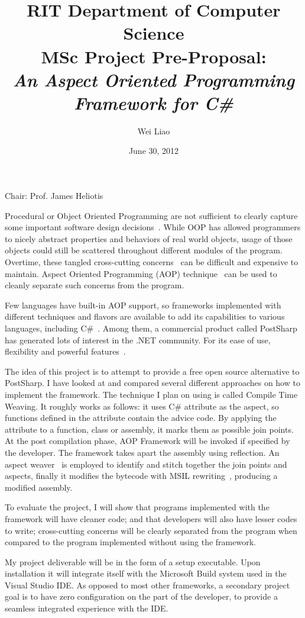 \documentclass[11pt]{artikel3}
\title{RIT Department of Computer Science\\MSc Project Pre-Proposal:\\\emph{An Aspect Oriented Programming Framework for C\#}}
\author{Wei Liao}
\date{June 30, 2012}
\begin{document}
\maketitle
Chair: Prof. James Heliotis

Procedural or Object Oriented Programming are not sufficient to clearly capture some important software design decisions~\cite{aop}. While OOP has allowed programmers to nicely abstract properties and behaviors of real world objects, usage of those objects could still be scattered throughout different modules of the program. Overtime, these tangled cross-cutting concerns~\cite{aop} can be difficult and expensive to maintain. Aspect Oriented Programming (AOP) technique~\cite{aop} can be used to cleanly separate such concerns from the program.

Few languages have built-in AOP support, so frameworks implemented with different techniques and flavors are available to add its capabilities to various languages, including C\#~\cite{postsharp, aspectcs, aopcs}. Among them, a commercial product called PostSharp has generated lots of interest in the .NET community. For its ease of use, flexibility and powerful features~\cite{postsharp}.

The idea of this project is to attempt to provide a free open source alternative to PostSharp. I have looked at and compared several different approaches on how to implement the framework. The technique I plan on using is called Compile Time Weaving. It roughly works as follows: it uses C\# attribute as the aspect, so functions defined in the attribute contain the advice code. By applying the attribute to a function, class or assembly, it marks them as possible join points. At the post compilation phase, AOP Framework will be invoked if specified by the developer. The framework takes apart the assembly using reflection. An aspect weaver~\cite{aop, postsharp} is employed to identify and stitch together the join points and aspects, finally it modifies the bytecode with MSIL rewriting~\cite{rewrite_msil}, producing a modified assembly.

To evaluate the project, I will show that programs implemented with the framework will have cleaner code; and that developers will also have lesser codes to write; cross-cutting concerns will be clearly separated from the program when compared to the program implemented without using the framework.

My project deliverable will be in the form of a setup executable. Upon installation it will integrate itself with the Microsoft Build system used in the Visual Studio IDE. As opposed to most other frameworks, a secondary project goal is to have zero configuration on the part of the developer, to provide a seamless integrated experience with the IDE.



\end{document}
